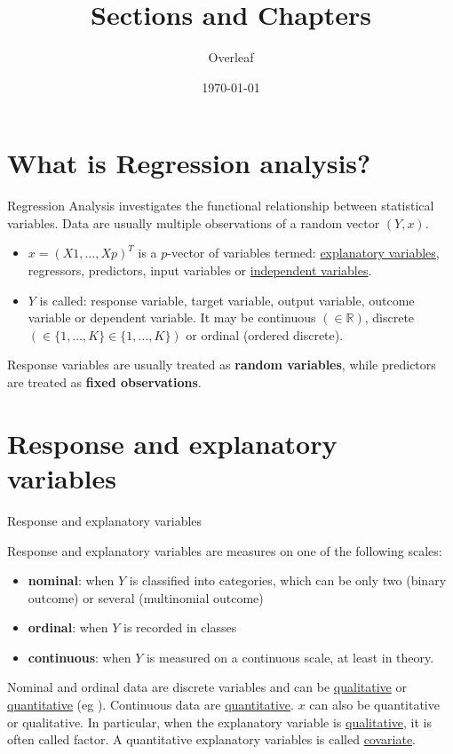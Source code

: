\documentclass[11pt]{article}
\title{Sections and Chapters}
\author{Overleaf}
\date{\today}
\begin{document}
\maketitle
\section{What is Regression analysis?}\label{sec:what-is-regression-analysis?}

Regression Analysis investigates the functional relationship between statistical variables.
Data are usually multiple observations of a random vector $(Y,x)$.
\begin{itemize}
\item $x=(X1,\dots,Xp)^T$ is a $p$-vector of variables termed: \underline{explanatory variables}, regressors, predictors, input variables or \underline{independent variables}.
\item $Y$ is called: response variable, target variable, output variable, outcome variable or dependent variable.
It may be continuous $(\in \mathbb{R})$, discrete $(\in \{1,\dots,K\} \in \{1,\dots,K\})$ or ordinal (ordered discrete).
\end{itemize}
Response variables are usually treated as \textbf{random variables}, while predictors are treated as \textbf{fixed observations}.
\blindtext

\section{Response and explanatory variables}\label{sec:response-and-explanatory-variables}
Response and explanatory variables

Response and explanatory variables are measures on one of the following scales:
\begin{itemize}
\item \textbf{nominal}: when $Y$ is classified into categories, which can be only two (binary outcome) or several (multinomial outcome)
\item \textbf{ordinal}: when $Y$ is recorded in classes
\item \textbf{continuous}: when $Y$ is measured on a continuous scale, at least in theory.
\end{itemize}
Nominal and ordinal data are discrete variables and can be \underline{qualitative} or \underline{quantitative} (eg ).
Continuous data are \underline{quantitative}.
$x$ can also be quantitative or qualitative.
In particular, when the explanatory variable is \underline{qualitative}, it is often called factor.
A quantitative explanatory variables is called \underline{covariate}.
\blindtext
\end{document}

